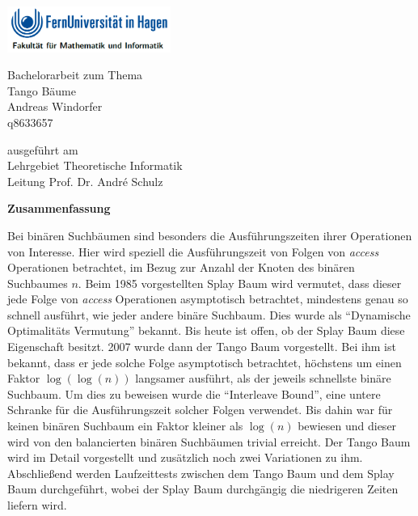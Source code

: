 \documentclass[a4paper,12pt]{article}
\begin{document}
\begin{center}
\includegraphics[width= 0.4\textwidth]{Medien/kleinkram/UniLogo}
\end{center}
\bigskip


 \begin{center}
 	\LARGE{Bachelorarbeit zum Thema\\
 	Tango Bäume}\\
 \bigskip
 \bigskip
 \bigskip
 \bigskip
\bigskip
\bigskip 
\bigskip
\bigskip
 \large{
 Andreas Windorfer\\
 q8633657}
 \end{center}
 \bigskip
 \bigskip
 \bigskip
 \bigskip 
 \bigskip
 \bigskip
 \bigskip 
  \bigskip 
 \bigskip
 \bigskip
 \bigskip 
  \begin{center}
 ausgeführt am\\
 Lehrgebiet Theoretische Informatik\\
 Leitung Prof. Dr. André Schulz\\
\end{center}

\author{Andreas Windorfer}





\newpage
\begin{center}
\textbf{Zusammenfassung}
\end{center}
 Bei binären Suchbäumen sind besonders die Ausführungszeiten ihrer Operationen von Interesse. Hier wird speziell die Ausführungszeit von Folgen von \textit{access} Operationen betrachtet, im Bezug zur Anzahl der Knoten des binären Suchbaumes $n$. Beim 1985  vorgestellten Splay Baum \cite{splay} wird vermutet, dass dieser jede Folge von  \textit{access} Operationen asymptotisch betrachtet, mindestens genau so schnell ausführt, wie jeder andere binäre Suchbaum. Dies wurde als \enquote{Dynamische Optimalitäts Vermutung} bekannt. Bis heute ist offen, ob der Splay Baum diese Eigenschaft besitzt.  2007 wurde dann der Tango Baum  \cite{demainDinamicOpti} vorgestellt. Bei ihm ist bekannt, dass er jede solche Folge asymptotisch betrachtet, höchstens um einen Faktor $\log\left(\log\left(n\right)\right)$ langsamer ausführt, als der jeweils schnellste binäre Suchbaum. Um dies zu beweisen wurde die \enquote{Interleave Bound}, eine untere Schranke für die Ausführungszeit solcher Folgen verwendet.  Bis dahin war für keinen binären Suchbaum ein Faktor kleiner als $\log\left(n\right)$ bewiesen und dieser wird von den balancierten binären Suchbäumen trivial erreicht. Der Tango Baum wird im Detail vorgestellt und zusätzlich noch zwei Variationen zu ihm. Abschließend werden Laufzeittests zwischen dem Tango Baum und dem Splay Baum durchgeführt, wobei der Splay Baum durchgängig die niedrigeren Zeiten liefern wird. 
\newpage
\tableofcontents
\newpage
\end{document}
